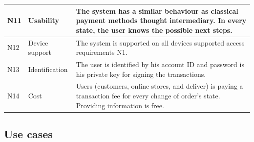 \documentclass[thesis=M,english]{FITthesis}[2019/12/23]
\begin{document}
\begin{table}[ht!]
\begin{tabular}{| p{0.5cm} | p{2.5cm} | p{10cm}|}
N11 &
  Usability &
  The system has a similar behaviour as classical payment methods thought intermediary. In every state, the user knows the possible next steps. \\ \hline
N12 &
  Device support &
  The system is supported on all devices supported access requirements N1. \\ \hline
N13 &
  Identification &
  The user is identified by his account ID and password is his private key for signing the transactions. \\ \hline
N14 &
  Cost &
  Users (customers, online stores, and deliver) is paying a transaction fee for every change of order's state. Providing information is free.  \\ \hline
\end{tabular}
\end{table}


\subsection{Use cases}

%
\end{document}

